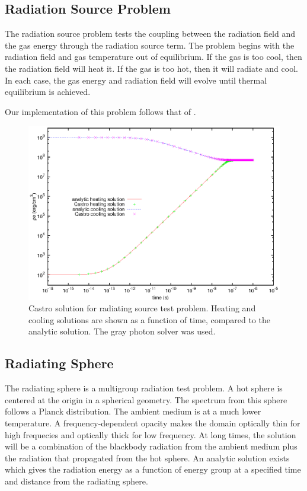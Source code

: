 \subsection{Radiation Source Problem}

The radiation source problem tests the coupling between the radiation
field and the gas energy through the radiation source term.  The
problem begins with the radiation field and gas temperature out of
equilibrium.  If the gas is too cool, then the radiation field will
heat it.  If the gas is too hot, then it will radiate and cool.  In
each case, the gas energy and radiation field will evolve until
thermal equilibrium is achieved.

Our implementation of this problem follows that of
\cite{swestymyra:2009}.

\begin{figure}[h]
\centering
\includegraphics[width=5.0in]{CastroVerification/radiating_source}
\caption{\label{fig:radsource} Castro solution for radiating source
  test problem.  Heating and cooling solutions are shown as a function
  of time, compared to the analytic solution.  The gray photon solver
  was used.}
\end{figure}


\subsection{Radiating Sphere}

The radiating sphere is a multigroup radiation test problem.  A hot
sphere is centered at the origin in a spherical geometry.  The
spectrum from this sphere follows a Planck distribution.  The ambient
medium is at a much lower temperature.  A frequency-dependent opacity
makes the domain optically thin for high frequecies and optically
thick for low frequency.  At long times, the solution will be a
combination of the blackbody radiation from the ambient medium plus
the radiation that propagated from the hot sphere.  An analytic
solution exists \cite{graziani:2008} which gives the radiation energy
as a function of energy group at a specified time and distance from
the radiating sphere.

